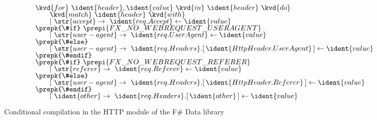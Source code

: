 
\begin{figure}
\begin{equation*}
\begin{array}{l}
\kvd{for}~\ident{header},\ident{value}~\kvd{in}~\ident{header}~\kvd{do}\\[-0.25em]
\hspace{2em}\kvd{match}~\ident{header}~\kvd{with}\\[-0.25em]
\hspace{2em}|~\str{accept} \rightarrow~ \ident{req.Accept} \leftarrow \ident{value}\\[-0.25em]
%
\prepk{\#if}~\prepi{FX\_NO\_WEBREQUEST\_USERAGENT}\\[-0.25em]
\hspace{2em}|~\str{user-agent} \rightarrow~ \ident{req.UserAgent} \leftarrow \ident{value}\\[-0.25em]
\prepk{\#else}\\[-0.25em]
\hspace{2em}|~\str{user-agent} \rightarrow~
  \ident{req.Headers}.[\,\ident{HttpHeader.UserAgent}\,] \leftarrow \ident{value}\\[-0.25em]
\prepk{\#endif}\\[-0.25em]
%
\prepk{\#if}~\prepi{FX\_NO\_WEBREQUEST\_REFERER}\\[-0.25em]
\hspace{2em}|~\str{referer} \rightarrow~ \ident{req.Referer} \leftarrow \ident{value}\\[-0.25em]
\prepk{\#else}\\[-0.25em]
\hspace{2em}|~\str{user-agent} \rightarrow~
  \ident{req.Headers}.[\,\ident{HttpHeader.Referer}\,] \leftarrow \ident{value}\\[-0.25em]
\prepk{\#endif}\\[-0.25em]
%
\hspace{2em}|~\ident{other} \rightarrow~ \ident{req.Headers}.[\,\ident{other}\,] \leftarrow \ident{value}\\[-0.25em]
\end{array}
\end{equation*}

\vspace{1em}
\noindent\makebox[\linewidth]{\rule{\textwidth}{0.5pt}} 
\vspace{-1.5em}
\caption{Conditional compilation in the HTTP module of the F\# Data library}
\label{fig:introduction-context-http}
\end{figure}

